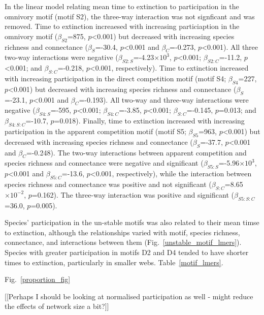 \documentclass[12pt]{article}
\begin{document}
			In the linear model relating mean time to extinction to participation in the omnivory motif (motif S2), the three-way interaction was not signficant and was removed. Time to extinction increaesed with increasing particiaption in the omnivory motif ($\beta_{S2}$=875, $p$\textless0.001) but decreased with increasing species richness and connectance ($\beta_{S}$=-30.4, $p$\textless0.001 and $\beta_{C}$=-0.273, $p$\textless0.001). All three two-way interactions were negative ($\beta_{S2:S}$=-4.23$\times10^3$, $p$\textless0.001; $\beta_{S2:C}$=-11.2, $p$\textless0.001; and $\beta_{S:C}$=-0.218, $p$\textless0.001, respectively).
			Time to extinction increased with increasing participation in the direct competition motif (motif S4; $\beta_{S4}$=227, $p$\textless0.001) but decreased with increasing species richness and connectance ($\beta_{S}$=-23.1, $p$\textless0.001 and $\beta_{C}$=-0.193). All two-way and three-way interactions were negative ($\beta_{S4:S}$=-595, $p$\textless0.001; $\beta_{S4:C}$=-3.85, $p$\textless0.001; $\beta_{S:C}$=-0.145, $p$=0.013; and $\beta_{S4:S:C}$=-10.7, $p$=0.018). 
			Finally, time to extinction increased with increasing participation in the apparent competition motif (motif S5; $\beta_{S5}$=963, $p$\textless0.001) but decreased with increasing species richness and connectance ($\beta_{S}$=-37.7, $p$\textless0.001 and $\beta_{C}$=-0.248). The two-way interactions between apparent competition and species richness and connectance were negative and significant ($\beta_{S5:S}$=-5.96$\times10^3$, $p$\textless0.001 and $\beta_{S5:C}$=-13.6, $p$\textless0.001, respectively), while the interaction between species richness and connectance was positive and not significant ($\beta_{S:C}$=8.65$\times10^{-2}$, $p$=0.162). The three-way interaction was positive and significant ($\beta_{S5:S:C}$=36.0, $p$=0.005). 


			Species' participation in the un-stable motifs was also related to their mean timse to extinction, although the relationships varied with motif, species richness, connectance, and interactions between them (Fig.~\ref{unstable_motif_lmers}). Species with greater participation in motifs D2 and D4 tended to have shorter times to extinction, particularly in smaller webs. Table~\ref{motif_lmers}. %


			Fig.~\ref{proportion_fig} %

			[[Perhaps I should be looking at normalised participation as well - might reduce the effects of network size a bit?]]
\end{document}
